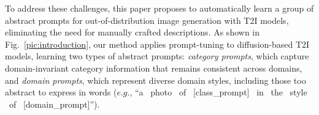 
To address these challenges, this paper proposes to automatically learn a group of abstract prompts for out-of-distribution image generation with T2I models, eliminating the need for manually crafted descriptions. 
As shown in Fig.~\textcolor{red}{\ref{pic:introduction}}, our method applies prompt-tuning to diffusion-based T2I models, learning two types of abstract prompts: \emph{category prompts}, which capture domain-invariant category information that remains consistent across domains, and \emph{domain prompts}, which represent diverse domain styles, including those too abstract to express in words ($e.g.$, ``a \ photo \ of \ [class\_prompt] \ in \ the \ style \ of \ [domain\_prompt]''). 
